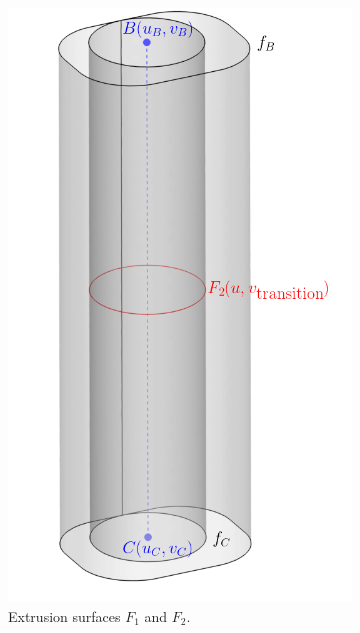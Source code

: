 \documentclass[a4paper, 11pt]{report}
\theoremstyle{definition}
\begin{document}
	\begin{figure}[H]
		\centering
		\begin{subfigure}{.35\textwidth}
			\includegraphics[width=\textwidth]{../tec/holes/00edit.png}
			\caption{Extrusion surfaces $F_1$ and $F_2$.}
		\end{subfigure}
		\begin{subfigure}{.35\textwidth}

\end{subfigure}
\end{figure}
\end{document}
